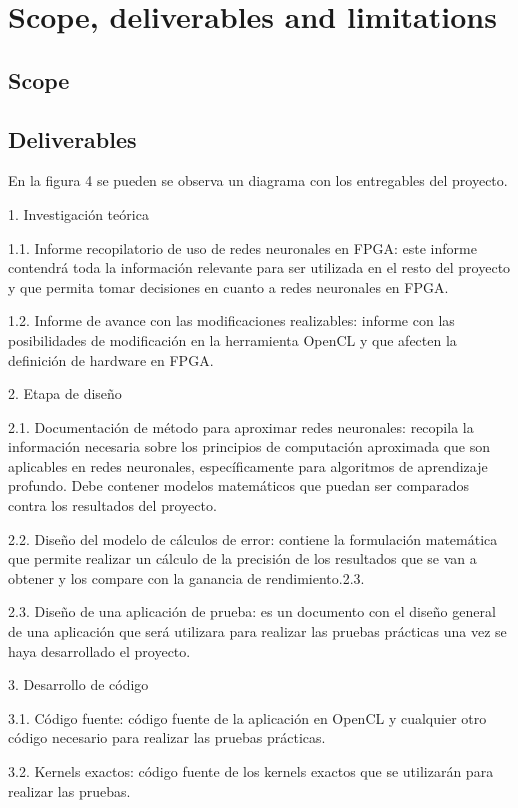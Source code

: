 \section{Scope, deliverables and limitations}

\subsection{Scope}


\subsection{Deliverables}

En la figura 4 se pueden se observa un diagrama con los entregables del proyecto.

1. Investigación teórica

1.1. Informe recopilatorio de uso de redes neuronales en FPGA: este informe contendrá toda
la información relevante para ser utilizada en el resto del proyecto y que permita tomar
decisiones en cuanto a redes neuronales en FPGA.

1.2. Informe de avance con las modificaciones realizables: informe con las posibilidades de
modificación en la herramienta OpenCL y que afecten la definición de hardware en
FPGA.

2. Etapa de diseño

2.1. Documentación de método para aproximar redes neuronales: recopila la información
necesaria sobre los principios de computación aproximada que son aplicables en redes
neuronales, específicamente para algoritmos de aprendizaje profundo. Debe contener
modelos matemáticos que puedan ser comparados contra los resultados del proyecto.

2.2. Diseño del modelo de cálculos de error: contiene la formulación matemática que
permite realizar un cálculo de la precisión de los resultados que se van a obtener y los
compare con la ganancia de rendimiento.2.3.

2.3. Diseño de una aplicación de prueba: es un documento con el diseño general de una
aplicación que será utilizara para realizar las pruebas prácticas una vez se haya
desarrollado el proyecto.


3. Desarrollo de código

3.1. Código fuente: código fuente de la aplicación en OpenCL y cualquier otro código
necesario para realizar las pruebas prácticas.

3.2. Kernels exactos: código fuente de los kernels exactos que se utilizarán para realizar las
pruebas.

